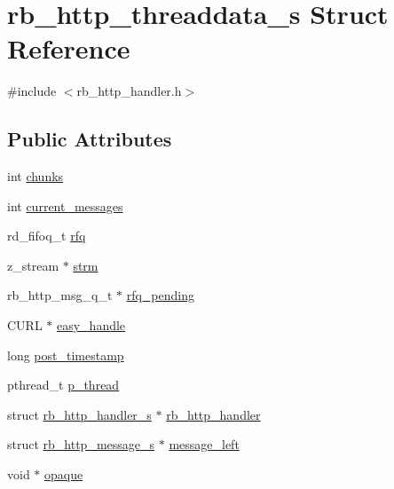 \hypertarget{structrb__http__threaddata__s}{}\section{rb\+\_\+http\+\_\+threaddata\+\_\+s Struct Reference}
\label{structrb__http__threaddata__s}


{\ttfamily \#include $<$rb\+\_\+http\+\_\+handler.\+h$>$}

\subsection*{Public Attributes}
\begin{DoxyCompactItemize}
\item 
int \hyperlink{structrb__http__threaddata__s_ac1c6fb826f5db3bbaca00a316cb06d58}{chunks}
\item 
int \hyperlink{structrb__http__threaddata__s_a543467d6c1a80b4f1c4a8adfdc1dd4e6}{current\+\_\+messages}
\item 
rd\+\_\+fifoq\+\_\+t \hyperlink{structrb__http__threaddata__s_a00e385e1aa5823aee8d3db72936956e2}{rfq}
\item 
z\+\_\+stream $\ast$ \hyperlink{structrb__http__threaddata__s_a246a6899a601436b9c28e893b4c376e3}{strm}
\item 
rb\+\_\+http\+\_\+msg\+\_\+q\+\_\+t $\ast$ \hyperlink{structrb__http__threaddata__s_abb3c07fa38012811cf4be59ef72b4748}{rfq\+\_\+pending}
\item 
C\+U\+R\+L $\ast$ \hyperlink{structrb__http__threaddata__s_a6931a61d737ef95f2cc45d23ea8c9a67}{easy\+\_\+handle}
\item 
long \hyperlink{structrb__http__threaddata__s_a67e29737b4f8a0be3bdc23a22fed5a0c}{post\+\_\+timestamp}
\item 
pthread\+\_\+t \hyperlink{structrb__http__threaddata__s_a60069683f9f9fdb21769e171162da3f1}{p\+\_\+thread}
\item 
struct \hyperlink{structrb__http__handler__s}{rb\+\_\+http\+\_\+handler\+\_\+s} $\ast$ \hyperlink{structrb__http__threaddata__s_a64b0cd10601b009f295181fabe882a3f}{rb\+\_\+http\+\_\+handler}
\item 
struct \hyperlink{structrb__http__message__s}{rb\+\_\+http\+\_\+message\+\_\+s} $\ast$ \hyperlink{structrb__http__threaddata__s_a5a0de7f05386fae47f1284bd82e3b7bf}{message\+\_\+left}
\item 
void $\ast$ \hyperlink{structrb__http__threaddata__s_abbaa8b640f2517967ac2d5915a8e2d50}{opaque}
\end{DoxyCompactItemize}



